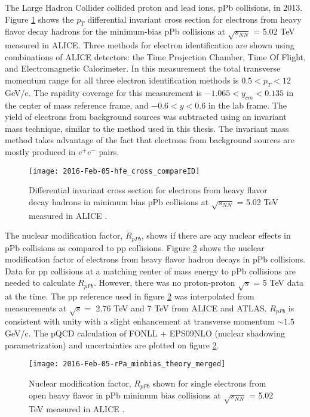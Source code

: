 The Large Hadron Collider collided proton and lead ions, pPb collisions, in 2013. Figure \ref{fig:2016-Feb-05-hfe_cross_compareID} shows the $p_{T}$ differential invariant cross section for electrons from heavy flavor decay hadrons for the minimum-bias pPb collisions at $\sqrt{s_{NN}}$ = 5.02 TeV measured in ALICE. Three methods for electron identification are shown using combinations of ALICE detectors: the Time Projection Chamber, Time Of Flight, and Electromagnetic Calorimeter. In this measurement the total transverse momentum range for all three electron identification methods is $0.5 < p_{T}<12$ GeV/c. The rapidity coverage for this measurement is $-1.065 < y_{cm} < 0.135$ in the center of mass reference frame, and $-0.6 < y < 0.6$ in the lab frame. The yield of electrons from background sources was subtracted using an invariant mass technique, similar to the method used in this thesis. The invariant mass method takes advantage of the fact that electrons from background sources are mostly produced in $e^{+} e^{-}$ pairs. 

\begin{figure}[h]
  \centering
  \texttt{[image: 2016-Feb-05-hfe\_cross\_compareID]}\\
  \caption{Differential invariant cross section for electrons from heavy flavor decay hadrons in minimum bias pPb collisions at $\sqrt{s_{NN}}$ = 5.02 TeV measured in ALICE \cite{Adam:2015qda}.} \label{fig:2016-Feb-05-hfe_cross_compareID}
\end{figure}


The nuclear modification factor, $R_{pPb}$, shows if there are any nuclear effects in pPb collisions as compared to pp collisions. Figure \ref{fig:2016-Feb-05-rPa_minbias_theory_merged} \cite{Adam:2015qda} shows the nuclear modification factor of electrons from heavy flavor hadron decays in pPb collisions. Data for pp collisions at a matching center of mass energy to pPb collisions are needed to calculate $R_{pPb}$. However, there was no proton-proton $\sqrt{s}$ = 5 TeV data at the time. The pp reference used in figure \ref{fig:2016-Feb-05-rPa_minbias_theory_merged} was interpolated from measurements at $\sqrt{s} = $ 2.76 TeV and 7 TeV from ALICE and ATLAS. $R_{pPb}$ is consistent with unity with a slight enhancement at transverse momentum $\sim 1.5$ GeV/c. The pQCD calculation of FONLL + EPS09NLO (nuclear shadowing parametrization) and uncertainties are plotted on figure \ref{fig:2016-Feb-05-rPa_minbias_theory_merged}. 


\begin{figure}[h]
  \centering
  \texttt{[image: 2016-Feb-05-rPa\_minbias\_theory\_merged]}\\
  \caption{Nuclear modification factor, $R_{pPb}$ shown for single electrons from open heavy flavor in pPb minimum bias collisions at $\sqrt{s_{NN}}$ = 5.02 TeV measured in ALICE \cite{Adam:2015qda}.} \label{fig:2016-Feb-05-rPa_minbias_theory_merged}
\end{figure}


